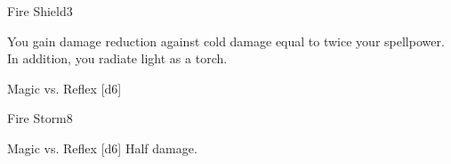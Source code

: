 \begin{spellsection}{Fire Shield}{3}
    \begin{spellheader}
    \end{spellheader}
    \begin{spellcontent}
        \begin{spelleffects}
            \spelleffect You gain damage reduction against cold damage equal to twice your spellpower. In addition, you radiate light as a torch.
            \spelldur \durshort \dismissable
        \end{spelleffects}
    \end{spellcontent}
    \begin{spellsubcontent}
        \begin{spelltargetinginfo}
        \end{spelltargetinginfo}
        \begin{spelleffects}
            \begin{spellattack}{Magic vs. Reflex}
                \spellsuccess {}[d6]
            \end{spellattack}
        \end{spelleffects}
    \end{spellsubcontent}
    \begin{spellfooter}
        \miscastexplode
    \end{spellfooter}
\end{spellsection}

\begin{spellsection}{Fire Storm}{8}
    \begin{spellheader}
    \end{spellheader}
    \begin{spellcontent}
        \begin{spelltargetinginfo}
        \end{spelltargetinginfo}
        \begin{spelleffects}
            \begin{spellattack}{Magic vs. Reflex}
                \spellsuccess {}[d6]
                \spellfailure Half damage.
            \end{spellattack}
        \end{spelleffects}
    \end{spellcontent}
    \begin{spellfooter}
        \miscastyou
    \end{spellfooter}
\end{spellsection}

